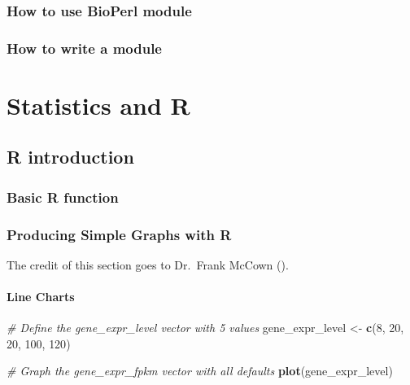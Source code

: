 \documentclass[]{book}
\makeatletter
\newenvironment{Shaded}{\begin{snugshade}}{\end{snugshade}}
\newcommand{\CommentTok}[1]{\textcolor[rgb]{0.56,0.35,0.01}{\textit{#1}}}
\newcommand{\DecValTok}[1]{\textcolor[rgb]{0.00,0.00,0.81}{#1}}
\newcommand{\KeywordTok}[1]{\textcolor[rgb]{0.13,0.29,0.53}{\textbf{#1}}}
\newcommand{\NormalTok}[1]{#1}
\newcommand{\StringTok}[1]{\textcolor[rgb]{0.31,0.60,0.02}{#1}}
\newenvironment{kframe}{%
\medskip{}
\setlength{\fboxsep}{.8em}
 \def\at@end@of@kframe{}%
 \ifinner\ifhmode%
  \def\at@end@of@kframe{\end{minipage}}%
  \begin{minipage}{\columnwidth}%
 \fi\fi%
 \def\FrameCommand##1{\hskip\@totalleftmargin \hskip-\fboxsep
 \colorbox{shadecolor}{##1}\hskip-\fboxsep
     \hskip-\linewidth \hskip-\@totalleftmargin \hskip\columnwidth}%
 \MakeFramed {\advance\hsize-\width
   \@totalleftmargin\z@ \linewidth\hsize
   \@setminipage}}%
 {\par\unskip\endMakeFramed%
 \at@end@of@kframe}
\renewenvironment{Shaded}{\begin{kframe}}{\end{kframe}}
\makeatother
\begin{document}
\hypertarget{how-to-use-bioperl-module}{%
\section{How to use BioPerl module}\label{how-to-use-bioperl-module}}

\hypertarget{how-to-write-a-module}{%
\section{How to write a module}\label{how-to-write-a-module}}

\hypertarget{part-statistics-and-r}{%
\part{Statistics and R}\label{part-statistics-and-r}}

\hypertarget{r-introduction}{%
\chapter{R introduction}\label{r-introduction}}

\hypertarget{basic-r-function}{%
\section{Basic R function}\label{basic-r-function}}

\hypertarget{producing-simple-graphs-with-r}{%
\section{Producing Simple Graphs with R}\label{producing-simple-graphs-with-r}}

The credit of this section goes to Dr.~Frank McCown (\citet{simpleGraphR}).

\hypertarget{line-charts}{%
\subsection{Line Charts}\label{line-charts}}

\begin{Shaded}
\begin{Highlighting}[]
\CommentTok{# Define the gene_expr_level vector with 5 values}
\NormalTok{gene_expr_level <-}\StringTok{ }\KeywordTok{c}\NormalTok{(}\DecValTok{8}\NormalTok{, }\DecValTok{20}\NormalTok{, }\DecValTok{20}\NormalTok{, }\DecValTok{100}\NormalTok{, }\DecValTok{120}\NormalTok{)}

\CommentTok{# Graph the gene_expr_fpkm vector with all defaults}
\KeywordTok{plot}\NormalTok{(gene_expr_level)}
\end{Highlighting}
\end{Shaded}
\end{document}
